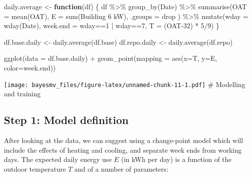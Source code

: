 \documentclass[
]{article}
\newenvironment{Shaded}{\begin{snugshade}}{\end{snugshade}}
\newcommand{\AttributeTok}[1]{\textcolor[rgb]{0.77,0.63,0.00}{#1}}
\newcommand{\ControlFlowTok}[1]{\textcolor[rgb]{0.13,0.29,0.53}{\textbf{#1}}}
\newcommand{\DecValTok}[1]{\textcolor[rgb]{0.00,0.00,0.81}{#1}}
\newcommand{\FunctionTok}[1]{\textcolor[rgb]{0.00,0.00,0.00}{#1}}
\newcommand{\NormalTok}[1]{#1}
\newcommand{\OtherTok}[1]{\textcolor[rgb]{0.56,0.35,0.01}{#1}}
\newcommand{\SpecialCharTok}[1]{\textcolor[rgb]{0.00,0.00,0.00}{#1}}
\newcommand{\StringTok}[1]{\textcolor[rgb]{0.31,0.60,0.02}{#1}}
\begin{document}
\begin{Shaded}
\begin{Highlighting}[]
\NormalTok{daily.average }\OtherTok{\textless{}{-}} \ControlFlowTok{function}\NormalTok{(df) \{}
\NormalTok{  df }\SpecialCharTok{\%\textgreater{}\%} 
    \FunctionTok{group\_by}\NormalTok{(Date) }\SpecialCharTok{\%\textgreater{}\%} 
    \FunctionTok{summarise}\NormalTok{(}\AttributeTok{OAT =} \FunctionTok{mean}\NormalTok{(OAT),}
              \AttributeTok{E =} \FunctionTok{sum}\NormalTok{(}\StringTok{\textasciigrave{}}\AttributeTok{Building 6 kW}\StringTok{\textasciigrave{}}\NormalTok{),}
              \AttributeTok{.groups =} \StringTok{\textquotesingle{}drop\textquotesingle{}}
\NormalTok{    ) }\SpecialCharTok{\%\textgreater{}\%} 
    \FunctionTok{mutate}\NormalTok{(}\AttributeTok{wday =} \FunctionTok{wday}\NormalTok{(Date),}
           \AttributeTok{week.end =}\NormalTok{ wday}\SpecialCharTok{==}\DecValTok{1} \SpecialCharTok{|}\NormalTok{ wday}\SpecialCharTok{==}\DecValTok{7}\NormalTok{,}
           \AttributeTok{T =}\NormalTok{ (OAT}\DecValTok{{-}32}\NormalTok{) }\SpecialCharTok{*} \DecValTok{5}\SpecialCharTok{/}\DecValTok{9}\NormalTok{)}
\NormalTok{\}}

\NormalTok{df.base.daily }\OtherTok{\textless{}{-}} \FunctionTok{daily.average}\NormalTok{(df.base)}
\NormalTok{df.repo.daily }\OtherTok{\textless{}{-}} \FunctionTok{daily.average}\NormalTok{(df.repo)}

\FunctionTok{ggplot}\NormalTok{(}\AttributeTok{data =}\NormalTok{ df.base.daily) }\SpecialCharTok{+}
  \FunctionTok{geom\_point}\NormalTok{(}\AttributeTok{mapping =} \FunctionTok{aes}\NormalTok{(}\AttributeTok{x=}\NormalTok{T, }\AttributeTok{y=}\NormalTok{E, }\AttributeTok{color=}\NormalTok{week.end))}
\end{Highlighting}
\end{Shaded}

\texttt{[image: bayesmv\_files/figure-latex/unnamed-chunk-11-1.pdf]}
\# Modelling and training

\hypertarget{step-1-model-definition}{%
\subsection{Step 1: Model definition}\label{step-1-model-definition}}

After looking at the data, we can suggest using a change-point model which will include the effects of heating and cooling, and separate week ends from working days. The expected daily energy use \(E\) (in kWh per day) is a function of the outdoor temperature \(T\) and of a number of parameters:
\end{document}
